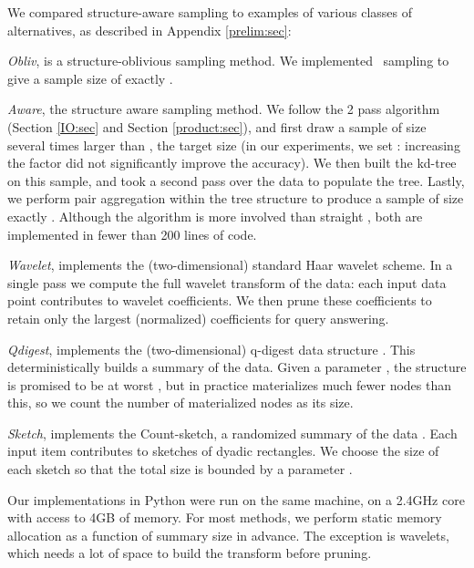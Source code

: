 \documentclass[11pt]{article}
\newcommand{\para}[1]{\medskip \noindent {\bf #1}}
\begin{document}
\para{Methods.}
We compared  structure-aware sampling  to examples of various
classes of alternatives, as described in Appendix \ref{prelim:sec}:


\begin{trivlist}
\item
{\em Obliv}, is a structure-oblivious sampling method. 
We implemented \varopt\ sampling
to give a sample size of exactly .

\item
 {\em Aware}, the structure aware sampling method. 
 We follow the 2 pass algorithm (Section \ref{IO:sec} and
Section \ref{product:sec}), and first
 draw a sample of size several times larger than , the target
 size (in our experiments, we set : increasing the
 factor did not significantly improve the accuracy).
 We then built the kd-tree on this sample, and took a second pass over
 the data to populate the tree.  
 Lastly, we perform pair aggregation within the tree structure to
 produce a sample of size exactly . 
Although the algorithm is more involved than straight \varopt, 
 both are implemented in fewer than 200 lines of code.

\item
{\em Wavelet}, implements the (two-dimensional) standard Haar wavelet scheme.  
In a single pass we compute the full wavelet transform of the data:
each input data point contributes to  wavelet
coefficients. 
We then prune these coefficients to retain only the  largest
(normalized) coefficients for query answering. 
\item
{\em Qdigest}, implements the (two-dimensional) q-digest data
structure \cite{HSST:ISAAC04}.
This deterministically builds a summary of the data. 
Given a parameter , the structure is promised to be at worst 
, but in practice
materializes much fewer nodes than this, so we count the number of
materialized nodes as its size.
\item
{\em Sketch}, implements the Count-sketch, a randomized summary of the
data \cite{ccf:icalp2002}. 
Each input item contributes to  sketches of
dyadic rectangles.  
We choose the size of each sketch so that the total size is bounded by 
a parameter . 
\end{trivlist}

Our implementations in Python were run on the same machine, on a 2.4GHz core
with access to 4GB of memory. 
For most methods, we perform static memory allocation as a function of
summary size in advance. 
The exception is wavelets, which needs a lot of space to build the
transform before pruning. 
\end{document}
